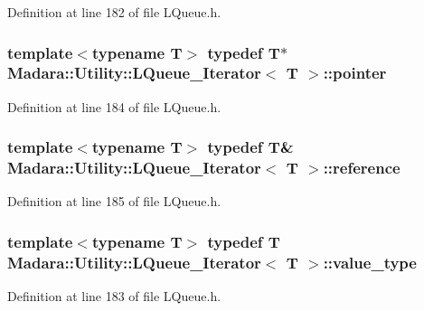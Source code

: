 Definition at line 182 of file LQueue.h.

\hypertarget{classMadara_1_1Utility_1_1LQueue__Iterator_ae2af259676274b8d3fb9b4bd22277154}{
\subsubsection[{pointer}]{\setlength{\rightskip}{0pt plus 5cm}template$<$typename T$>$ typedef T$\ast$ {\bf Madara::Utility::LQueue\_\-Iterator}$<$ T $>$::{\bf pointer}}}
\label{df/dbb/classMadara_1_1Utility_1_1LQueue__Iterator_ae2af259676274b8d3fb9b4bd22277154}


Definition at line 184 of file LQueue.h.

\hypertarget{classMadara_1_1Utility_1_1LQueue__Iterator_aaf4374375c6d85774b8416200c6aa658}{
\subsubsection[{reference}]{\setlength{\rightskip}{0pt plus 5cm}template$<$typename T$>$ typedef T\& {\bf Madara::Utility::LQueue\_\-Iterator}$<$ T $>$::{\bf reference}}}
\label{df/dbb/classMadara_1_1Utility_1_1LQueue__Iterator_aaf4374375c6d85774b8416200c6aa658}


Definition at line 185 of file LQueue.h.

\hypertarget{classMadara_1_1Utility_1_1LQueue__Iterator_ad14a2201e06e7b02176606f10f6bbae5}{
\subsubsection[{value\_\-type}]{\setlength{\rightskip}{0pt plus 5cm}template$<$typename T$>$ typedef T {\bf Madara::Utility::LQueue\_\-Iterator}$<$ T $>$::{\bf value\_\-type}}}
\label{df/dbb/classMadara_1_1Utility_1_1LQueue__Iterator_ad14a2201e06e7b02176606f10f6bbae5}


Definition at line 183 of file LQueue.h.



